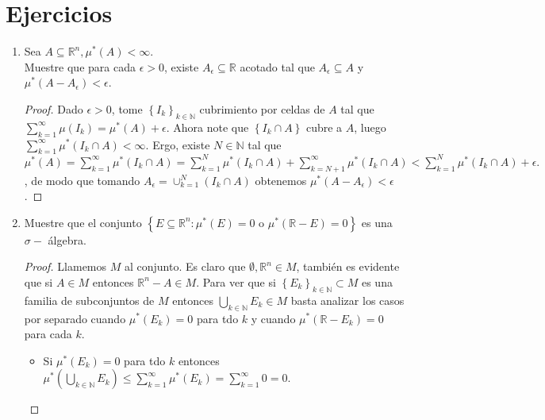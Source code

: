 \documentclass[spanish,12pt,a4paper,openany]{book}
\begin{document}
	\section{Ejercicios} \label{Ejercicios 2}
		\begin{enumerate}
			\item Sea $A \subseteq \mathbb{R}^{n}, \mu ^{*} (A) < \infty$.\\
			Muestre que para cada $\epsilon > 0$, existe $A_{\epsilon} \subseteq \mathbb{R}$ acotado tal que $A_{\epsilon} \subseteq A$ y $\mu ^{*} (A - A_{\epsilon}) < \epsilon$.
			
			\begin{proof}
				Dado $\epsilon > 0 $, tome $\left\{I_{k}\right\}_{k \in \mathbb{N}}$ cubrimiento por celdas de $A$ tal que $\sum_{k=1}^{\infty} \mu(I_{k}) = \mu^{*}(A) + \epsilon$. Ahora note que $\left\{I_{k} \cap A \right\}$ cubre a $A$, luego $\displaystyle \sum_{k=1}^{\infty} \mu^{*}(I_{k} \cap A) < \infty$. Ergo, existe $N \in \mathbb{N}$ tal que $\mu^{*}(A) = \displaystyle \sum_{k=1}^{\infty} \mu^{*}(I_{k} \cap A) = \displaystyle \sum_{k=1}^{N} \mu^{*}(I_{k} \cap A) + \displaystyle \sum_{k=N+1}^{\infty} \mu^{*}(I_{k} \cap A) < \displaystyle \sum_{k=1}^{N} \mu^{*}(I_{k} \cap A) + \epsilon.$, de modo que tomando $A_{\epsilon} = \cup_{k=1}^{N} (I_{k} \cap A)$ obtenemos $\mu^{*}(A - A_{\epsilon}) < \epsilon$.
			\end{proof}
			
			\item  Muestre que el conjunto $\left\{E \subseteq \mathbb{R} ^{n} : \mu^{*} (E)  = 0 \text{ o } \mu^{*} (\mathbb{R} - E)  = 0 \right\}$ es una $\sigma-$ álgebra.
			\begin{proof}
				Llamemos $ M $ al conjunto. Es claro que $\emptyset, \mathbb{R}^{n} \in M$, también es evidente que si $A \in M$ entonces $\mathbb{R}^{n} - A \in M$. Para ver que si $\left\{ E_{k}\right\}_{k \in \mathbb{N}} \subset M$ es una familia de subconjuntos de $M$ entonces $\bigcup_{k \in \mathbb{N}} E_{k} \in M$ basta analizar los casos por separado cuando $\mu^{*} (E_{k}) = 0$ para tdo $k$ y cuando $\mu^{*}(\mathbb{R}-E_{k}) = 0$ para cada $k$.\\
				
				\begin{itemize}
					\item Si  $\mu^{*} (E_{k}) = 0$ para tdo $k$  entonces $\mu^{*}(\bigcup_{k \in \mathbb{N}} E_{k}) \leq \sum_{k=1}^{\infty} \mu ^{*}(E_{k}) = \sum_{k=1}^{\infty} 0 = 0$.
					

\end{itemize}
\end{proof}
\end{enumerate}
\end{document}
